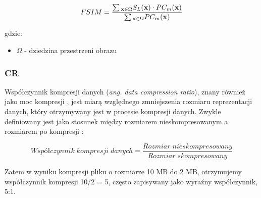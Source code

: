 \documentclass{article}
\begin{document}
\begin{equation}
{FSIM} = {{\sum\limits {_{{\bf x} \in \Omega } {S_{L}}({\bf x}) \cdot PC_{m}({\bf x})} } \over {\sum\limits {_{{\bf x} \in \Omega } PC_{m}({\bf x})}}}
\end{equation}

gdzie:
\begin{itemize}[label=]
    \item $\Omega$ - dziedzina przestrzeni obrazu
\end{itemize}

\subsubsection{CR}

Współczynnik kompresji danych (\textit{ang. data compression ratio}), znany również jako moc kompresji , jest miarą względnego zmniejszenia rozmiaru reprezentacji danych, który otrzymywany jest w procesie kompresji danych. Zwykle definiowany jest jako stosunek między rozmiarem nieskompresowanym a rozmiarem po kompresji :

\begin{equation}
Współczynnik\;kompresji\;danych = \frac{Rozmiar\;nieskompresowany}{Rozmiar\;skompresowany}
\end{equation}

Zatem w wyniku kompresji pliku o rozmiarze 10 MB do 2 MB, otrzymujemy współczynnik kompresji 10/2 = 5, często zapisywany jako wyraźny współczynnik, 5:1.\cite{compression_ratio}
\end{document}
